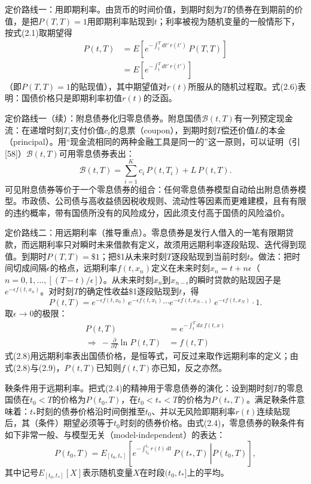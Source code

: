 定价路线一：用即期利率。由货币的时间价值，到期时刻为$T$的债券在到期前的价值，是把$P(T,T)=1$用即期利率贴现到$t$；利率被视为随机变量的一般情形下，按式(2.1)取期望得
\begin{align*}
P(t,T)&=E\!\left[e^{-\int_t^T dt'\,r(t')}\,P(T,T)\right]\\
&=E\!\left[e^{-\int_t^T dt'\,r(t')}\right]
\tag{2.6}
\end{align*}
（即$P(T,T)=1$的贴现值），其中期望值对$r(t)$所服从的随机过程取。式(2.6)表明：国债价格只是即期利率初值$r(t)$的泛函。

定价路线一（续）：附息债券化归零息债券。附息国债$\mathcal{B}(t,T)$有一列预定现金流：在递增时刻$T_i$支付价值$c_i$的息票（coupon），到期时刻$T$偿还价值$L$的本金（principal）。用“现金流相同的两种金融工具是同一的”这一原则，可以证明（引[58]）$\mathcal{B}(t,T)$可用零息债券表出：
\begin{equation*}
\mathcal{B}(t,T)=\sum_{i=1}^{K}c_i\,P(t,T_i)+L\,P(t,T).
\tag{2.7}
\end{equation*}
可见附息债券等价于一个零息债券的组合：任何零息债券模型自动给出附息债券模型。市政债、公司债与高收益债因税收规则、流动性等因素而更难建模，且有有限的违约概率，带有国债所没有的风险成分，因此须支付高于国债的风险溢价。

定价路线二：用远期利率（推导重点）。零息债券是发行人借入的一笔有限期贷款，而远期利率只对瞬时未来借款有定义，故须用远期利率逐段贴现、迭代得到现值。到期时$P(T,T)=\$1$；把\$1从未来时刻$T$逐段贴现到当前时刻$t$。做法：把时间切成间隔$\epsilon$的格点，远期利率$f(t,x_n)$定义在未来时刻$x_n=t+n\epsilon$（$n=0,1,\ldots,[(T-t)/\epsilon]$）。从未来时刻$x_n$到$x_{n-\epsilon}$的瞬时贷款的贴现因子是$e^{-\epsilon f(t,x_n)}$。对时刻$T$的确定性收益\$1逐段贴现到$t$，得
\begin{equation*}
P(t,T)=e^{-\epsilon f(t,x_0)}\,e^{-\epsilon f(t,x_1)}\cdots e^{-\epsilon f(t,x_{N-1})}\,e^{-\epsilon f(t,x_N)}\cdot 1 .
\end{equation*}
取$\epsilon\to 0$的极限：
\begin{align*}
P(t,T)&=e^{-\int_t^T dx\,f(t,x)}
\tag{2.8}\\[2pt]
\Rightarrow\ -\frac{\partial}{\partial T}\ln P(t,T)&=f(t,T)
\tag{2.9}
\end{align*}
式(2.8)用远期利率表出国债价格，是恒等式，可反过来取作远期利率的定义；由式(2.8)与(2.9)，$P(t,T)$已知则$f(t,T)$亦已知，反之亦然。

鞅条件用于远期利率。把式(2.4)的精神用于零息债券的演化：设到期时刻$T$的零息国债在$t_0<T$的价格为$P(t_0,T)$，在$t_0<t_*<T$的价格为$P(t_*,T)$。满足鞅条件意味着：$t_*$时刻的债券价格沿时间倒推至$t_0$、并以无风险即期利率$r(t)$连续贴现后，其（条件）期望必须等于$t_0$时刻的债券价格。由式(2.4)，零息债券的鞅条件有如下非常一般、与模型无关（model-independent）的表达：
\begin{equation*}
P(t_0,T)=E_{[t_0,t_*]}\!\left[\left.e^{-\int_{t_0}^{t_*}r(t)\,dt}\,P(t_*,T)\,\right|P(t_0,T)\right],
\tag{2.10}
\end{equation*}
其中记号$E_{[t_0,t_*]}[X]$表示随机变量$X$在时段$(t_0,t_*]$上的平均。

